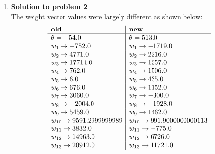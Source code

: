 
\usepackage{algorithm}
\usepackage{listings}
\usepackage{graphicx,amssymb,amsmath}
\usepackage{epstopdf}
\usepackage{color}
\sloppy


\oddsidemargin 0in
\evensidemargin 0in
\textwidth 6.5in
\topmargin -0.5in
\textheight 9.0in




\pagestyle{myheadings}  %

\begin{enumerate}

	\item {\bf Solution to problem 2} \\
		The weight vector values were largely different as shown below: \\
		\[
			\begin{array}{l|l}
				\text{\bf{old}} & \text{\bf{new}} \\
				\hline 
				\theta = -54.0 & \theta = 513.0 \\
				w_{1} \rightarrow -752.0 & w_{1} \rightarrow -1719.0  \\
				w_{2} \rightarrow 4771.0 & w_{2} \rightarrow 2216.0  \\
				w_{3} \rightarrow 17714.0 & w_{3} \rightarrow 1357.0  \\
				w_{4} \rightarrow 762.0 & w_{4} \rightarrow 1506.0  \\
				w_{5} \rightarrow 6.0 & w_{5} \rightarrow 435.0  \\
				w_{6} \rightarrow 676.0 & w_{6} \rightarrow 1152.0  \\
				w_{7} \rightarrow 3060.0 & w_{7} \rightarrow -300.0  \\
				w_{8} \rightarrow -2004.0 & w_{8} \rightarrow -1928.0  \\
				w_{9} \rightarrow 5459.0 & w_{9} \rightarrow 1462.0  \\
				w_{10} \rightarrow 9591.2999999989 & w_{10} \rightarrow 991.9000000000113  \\
				w_{11} \rightarrow 3832.0 & w_{11} \rightarrow -775.0  \\
				w_{12} \rightarrow 14963.0 & w_{12} \rightarrow 6726.0 \\
				w_{13} \rightarrow 20912.0 & w_{13} \rightarrow 11721.0  \\
				
			\end{array}	
		\] \\
				

\end{enumerate}
